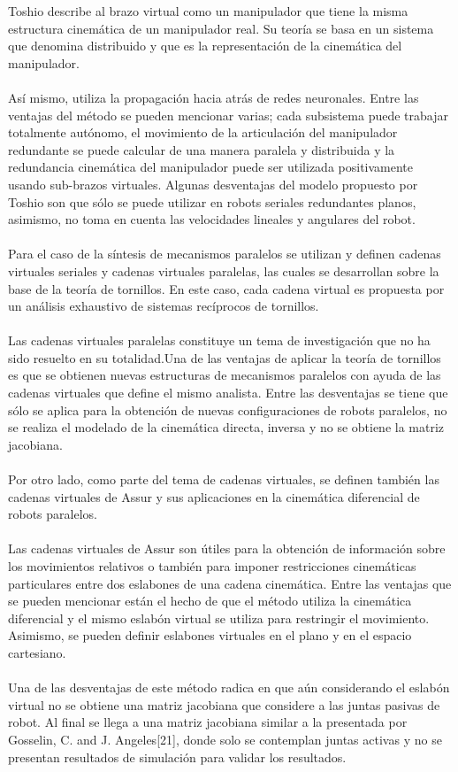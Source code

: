 \documentclass[letter,openright,12pt,spanish]{report}
\begin{document}
Toshio describe al brazo virtual como un manipulador que tiene la misma estructura cinemática de un manipulador real. Su teoría se basa en un sistema que denomina distribuido y que es la representación de la cinemática del manipulador.\\
\\
 Así mismo, utiliza la propagación hacia atrás de redes neuronales. Entre las ventajas del método se pueden mencionar varias; cada subsistema puede trabajar totalmente autónomo, el movimiento de la articulación del manipulador redundante se puede calcular de una manera paralela y distribuida y la redundancia cinemática del manipulador puede ser utilizada positivamente usando sub-brazos virtuales. Algunas desventajas del modelo propuesto por Toshio son que sólo se puede utilizar en robots seriales redundantes planos, asimismo, no toma en cuenta las velocidades lineales y angulares del robot.\\
\\
Para el caso de la síntesis de mecanismos paralelos se utilizan y definen cadenas virtuales seriales y cadenas virtuales paralelas, las cuales se desarrollan sobre la base de la teoría de tornillos. En este caso, cada cadena virtual es propuesta por un análisis exhaustivo de sistemas recíprocos de tornillos.\\
\\
Las cadenas virtuales paralelas constituye un tema de investigación que no ha sido resuelto en su totalidad.Una de las ventajas de aplicar la teoría de tornillos es que se obtienen nuevas estructuras de mecanismos paralelos con ayuda de las cadenas virtuales que define el mismo analista. Entre las desventajas se tiene que sólo se aplica para la obtención de nuevas configuraciones de robots paralelos, no se realiza el modelado de la cinemática directa, inversa y no se obtiene la matriz jacobiana.\\
\\
Por otro lado, como parte del tema de cadenas virtuales, se definen también las cadenas virtuales de Assur y sus aplicaciones en la cinemática diferencial de robots paralelos.\\
\\
 Las cadenas virtuales de Assur son útiles para la obtención de información sobre los movimientos relativos o también para imponer restricciones cinemáticas particulares entre dos eslabones de una cadena cinemática. Entre las ventajas que se pueden mencionar están el hecho de que el método utiliza la cinemática diferencial y el mismo eslabón virtual se utiliza para restringir el movimiento. Asimismo, se pueden definir eslabones virtuales en el plano y en el espacio cartesiano. \\
\\Una de las desventajas de este método radica en que aún considerando el eslabón virtual no se obtiene una matriz jacobiana que considere a las juntas pasivas de robot. Al final se llega a una matriz jacobiana similar a la presentada por Gosselin, C. and J. Angeles[21], donde solo se contemplan juntas activas y no se presentan resultados de simulación para validar los resultados.\\
\end{document}
